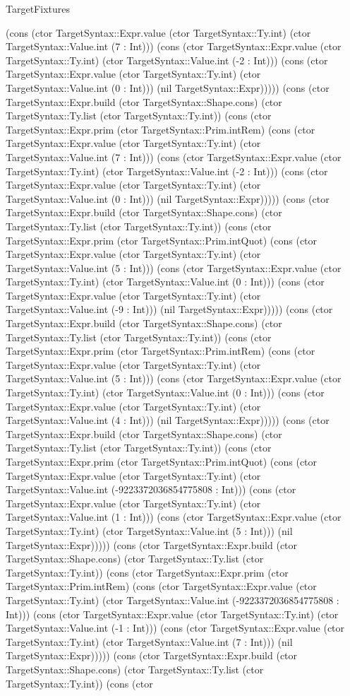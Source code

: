 \begin{lexlean}{TargetFixtures}
\begin{semanticmodule}
{(cons (ctor TargetSyntax::Expr.value (ctor TargetSyntax::Ty.int) (ctor TargetSyntax::Value.int (7 : Int))) (cons (ctor TargetSyntax::Expr.value (ctor TargetSyntax::Ty.int) (ctor TargetSyntax::Value.int (-2 : Int))) (cons (ctor TargetSyntax::Expr.value (ctor TargetSyntax::Ty.int) (ctor TargetSyntax::Value.int (0 : Int))) (nil TargetSyntax::Expr))))) (cons (ctor TargetSyntax::Expr.build (ctor TargetSyntax::Shape.cons) (ctor TargetSyntax::Ty.list (ctor TargetSyntax::Ty.int)) (cons (ctor TargetSyntax::Expr.prim (ctor TargetSyntax::Prim.intRem) (cons (ctor TargetSyntax::Expr.value (ctor TargetSyntax::Ty.int) (ctor TargetSyntax::Value.int (7 : Int))) (cons (ctor TargetSyntax::Expr.value (ctor TargetSyntax::Ty.int) (ctor TargetSyntax::Value.int (-2 : Int))) (cons (ctor TargetSyntax::Expr.value (ctor TargetSyntax::Ty.int) (ctor TargetSyntax::Value.int (0 : Int))) (nil TargetSyntax::Expr))))) (cons (ctor TargetSyntax::Expr.build (ctor TargetSyntax::Shape.cons) (ctor TargetSyntax::Ty.list (ctor TargetSyntax::Ty.int)) (cons (ctor TargetSyntax::Expr.prim (ctor TargetSyntax::Prim.intQuot) (cons (ctor TargetSyntax::Expr.value (ctor TargetSyntax::Ty.int) (ctor TargetSyntax::Value.int (5 : Int))) (cons (ctor TargetSyntax::Expr.value (ctor TargetSyntax::Ty.int) (ctor TargetSyntax::Value.int (0 : Int))) (cons (ctor TargetSyntax::Expr.value (ctor TargetSyntax::Ty.int) (ctor TargetSyntax::Value.int (-9 : Int))) (nil TargetSyntax::Expr))))) (cons (ctor TargetSyntax::Expr.build (ctor TargetSyntax::Shape.cons) (ctor TargetSyntax::Ty.list (ctor TargetSyntax::Ty.int)) (cons (ctor TargetSyntax::Expr.prim (ctor TargetSyntax::Prim.intRem) (cons (ctor TargetSyntax::Expr.value (ctor TargetSyntax::Ty.int) (ctor TargetSyntax::Value.int (5 : Int))) (cons (ctor TargetSyntax::Expr.value (ctor TargetSyntax::Ty.int) (ctor TargetSyntax::Value.int (0 : Int))) (cons (ctor TargetSyntax::Expr.value (ctor TargetSyntax::Ty.int) (ctor TargetSyntax::Value.int (4 : Int))) (nil TargetSyntax::Expr))))) (cons (ctor TargetSyntax::Expr.build (ctor TargetSyntax::Shape.cons) (ctor TargetSyntax::Ty.list (ctor TargetSyntax::Ty.int)) (cons (ctor TargetSyntax::Expr.prim (ctor TargetSyntax::Prim.intQuot) (cons (ctor TargetSyntax::Expr.value (ctor TargetSyntax::Ty.int) (ctor TargetSyntax::Value.int (-9223372036854775808 : Int))) (cons (ctor TargetSyntax::Expr.value (ctor TargetSyntax::Ty.int) (ctor TargetSyntax::Value.int (1 : Int))) (cons (ctor TargetSyntax::Expr.value (ctor TargetSyntax::Ty.int) (ctor TargetSyntax::Value.int (5 : Int))) (nil TargetSyntax::Expr))))) (cons (ctor TargetSyntax::Expr.build (ctor TargetSyntax::Shape.cons) (ctor TargetSyntax::Ty.list (ctor TargetSyntax::Ty.int)) (cons (ctor TargetSyntax::Expr.prim (ctor TargetSyntax::Prim.intRem) (cons (ctor TargetSyntax::Expr.value (ctor TargetSyntax::Ty.int) (ctor TargetSyntax::Value.int (-9223372036854775808 : Int))) (cons (ctor TargetSyntax::Expr.value (ctor TargetSyntax::Ty.int) (ctor TargetSyntax::Value.int (-1 : Int))) (cons (ctor TargetSyntax::Expr.value (ctor TargetSyntax::Ty.int) (ctor TargetSyntax::Value.int (7 : Int))) (nil TargetSyntax::Expr))))) (cons (ctor TargetSyntax::Expr.build (ctor TargetSyntax::Shape.cons) (ctor TargetSyntax::Ty.list (ctor TargetSyntax::Ty.int)) (cons (ctor }
\end{semanticmodule}
\end{lexlean}
